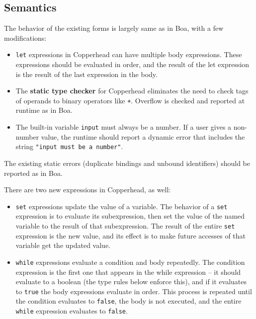 \documentclass[10pt, oneside]{article}
\begin{document}
\subsection*{Semantics}

The behavior of the existing forms is largely same as in Boa, with a few
modifications:

\begin{itemize}
\item \texttt{let} expressions in Copperhead can have multiple body
expressions. These expressions should be evaluated in order, and the result
of the let expression is the result of the last expression in the body.
\item The {\bf static type checker} for Copperhead eliminates the need to check
tags of operands to binary operators like \texttt{+}. Overflow is
checked and reported at runtime as in Boa.
\item The built-in variable \texttt{input} must always be a number. If a user
gives a non-number value, the runtime should report a dynamic error that
includes the string \texttt{"input must be a number"}.
\end{itemize}

The existing static errors (duplicate bindings and unbound identifiers)
should be reported as in Boa.

There are two new expressions in Copperhead, as well:

\begin{itemize}

\item \texttt{set} expressions update the value of a variable. The behavior
of a \texttt{set} expression is to evaluate its subexpression, then set the
value of the named variable to the result of that subexpression. The result
of the entire \texttt{set} expression is the new value, and its effect is to
make future accesses of that variable get the updated value.

\item \texttt{while} expressions evaluate a condition and body repeatedly.
The condition expression is the first one that appears in the while
expression -- it should evaluate to a boolean (the type rules below enforce
this), and if it evaluates to \texttt{true} the body expressions evaluate in
order. This process is repeated until the condition evaluates to
\texttt{false}, the body is not executed, and the entire \texttt{while}
expression evaluates to \texttt{false}.

\end{itemize}
\end{document}
